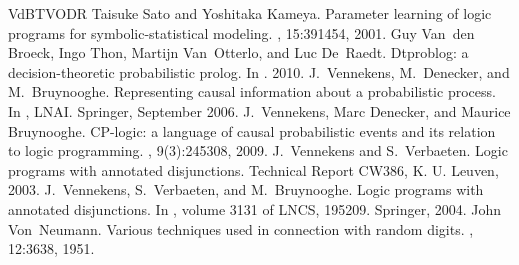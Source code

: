 \documentclass[letterpaper,10pt,english]{sphinxmanual}
\begin{document}
\begin{sphinxthebibliography}{VdBTVODR}
Taisuke Sato and Yoshitaka Kameya. Parameter learning of logic programs for symbolic-statistical modeling. , 15:391\textendash{}454, 2001.
Guy Van den Broeck, Ingo Thon, Martijn Van Otterlo, and Luc De Raedt. Dtproblog: a decision-theoretic probabilistic prolog. In . 2010.
J. Vennekens, M. Denecker, and M. Bruynooghe. Representing causal information about a probabilistic process. In , LNAI. Springer, September 2006.
J. Vennekens, Marc Denecker, and Maurice Bruynooghe. CP-logic: a language of causal probabilistic events and its relation to logic programming. , 9(3):245\textendash{}308, 2009.
J. Vennekens and S. Verbaeten. Logic programs with annotated disjunctions. Technical Report CW386, K. U. Leuven, 2003.
J. Vennekens, S. Verbaeten, and M. Bruynooghe. Logic programs with annotated disjunctions. In , volume 3131 of LNCS, 195\textendash{}209. Springer, 2004.
John Von Neumann. Various techniques used in connection with random digits. , 12:36\textendash{}38, 1951.
\end{sphinxthebibliography}



\renewcommand{\indexname}{Index}
\printindex
\end{document}
